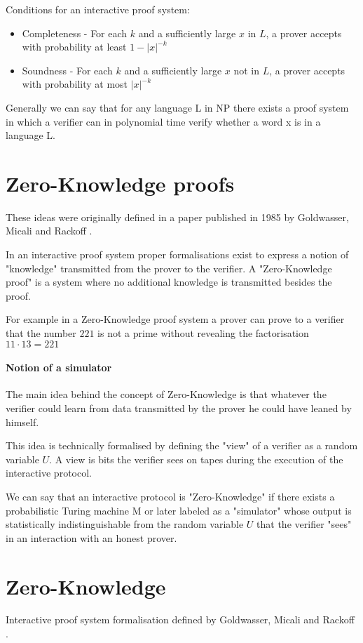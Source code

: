 \documentclass[12pt,a4paper]{article}
\begin{document}
Conditions for an interactive proof system:
\begin{itemize}
  \item Completeness - For each $k$ and a sufficiently large $x$ in $L$, a prover accepts with probability at least $1 - |x|^{-k}$ 
  \item Soundness - For each $k$ and a sufficiently large $x$ not in $L$, a prover accepts with   probability at most $|x|^{-k}$
\end{itemize}
Generally we can say that for any language L in NP there exists a proof system in which a verifier can in polynomial time verify whether a word x is in a language L.

\newpage
\section{Zero-Knowledge proofs}
These ideas were originally defined in a paper published in 1985 by Goldwasser, Micali and Rackoff \cite{10.1145/22145.22178}. 

In an interactive proof system proper formalisations exist to express a notion of "knowledge" transmitted from the prover to the verifier. A "Zero-Knowledge proof" is a system where no additional knowledge is transmitted besides the proof.

For example in a Zero-Knowledge proof system a prover can prove to a verifier that the number $221$ is not a prime without revealing the factorisation $11 \cdot 13 = 221$

\paragraph{Notion of a simulator}
The main idea behind the concept of Zero-Knowledge is that whatever the verifier could learn from data transmitted by the prover he could have leaned by himself.

This idea is technically formalised by defining the "view" of a verifier as a random variable $U$. A view is bits the verifier sees on tapes during the execution of the interactive protocol.

We can say that an interactive protocol is "Zero-Knowledge" if there exists a probabilistic Turing machine M or later labeled as a "simulator" whose output is statistically indistinguishable from the random variable $U$ that the verifier "sees" in an interaction with an honest prover.


\section{Zero-Knowledge}
Interactive proof system formalisation defined by Goldwasser, Micali and Rackoff \cite{10.1145/22145.22178}.
\end{document}
